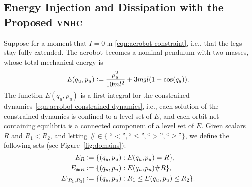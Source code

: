 \documentclass[journal,twoside,web, twocolumn,draftcls]{ieeecolor}
\newcommand*{\eqdef}{\vcentcolon=}
\newcommand*{\vnhc}{\textsc{vnhc}\xspace}
\begin{document}
\subsection{Energy Injection and Dissipation with the Proposed \vnhc}\label{sec:energy-inject-diss}
Suppose for a moment that \(I = 0\) in \eqref{eqn:acrobot-constraint}, i.e.,
that the legs stay fully extended.
The acrobot becomes a nominal pendulum with two masses, whose total mechanical
energy is
\begin{equation}\label{eqn:nominal-energy}
    E(q_u,p_u) \eqdef \frac{p_u^2}{10ml^2} + 3mgl(1 - \cos(q_u))
    .
\end{equation}
The function $E(q_u,p_u)$ is a first integral for the constrained
dynamics~\eqref{eqn:acrobot-constrained-dynamics}, i.e., each solution of the
constrained dynamics is confined to a level set of $E$, and each orbit not
containing equilibria is a connected component of a level set of $E$. Given
scalars $R$ and $R_1<R_2$, and letting $\# \in \{$
``$<$''$,$``$\leq$''$,$``$>$''$,$``$\geq$''$\}$, we define the following sets
(see Figure~\ref{fig:domains}):
\begin{equation}\label{eq:E_sets}
\begin{aligned}
E_R &\eqdef \{(q_u,p_u): E(q_u,p_u) = R\}, \\
E_{\# R} &\eqdef \{(q_u,p_u): E(q_u,p_u) \#R\}, \\
E_{[R_1,R_2]} &\eqdef \{(q_u,p_u): R_1 \leq E(q_u,p_u) \leq R_2\}.
\end{aligned}
\end{equation}
%
%
%
\end{document}
